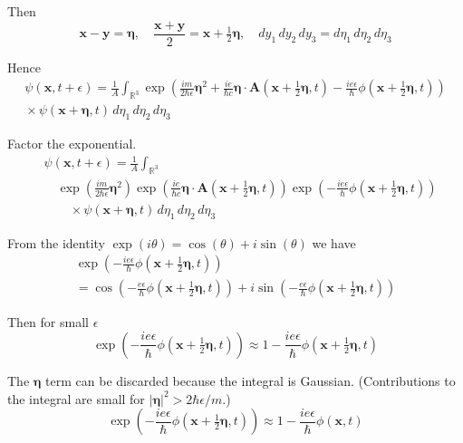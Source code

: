 \documentclass[12pt]{article}
\newcommand\INT{\int_{\mathbb R^3}}
\begin{document}
Then
\begin{equation*}
\mathbf x-\mathbf y=\boldsymbol\eta,\quad
\frac{\mathbf x+\mathbf y}{2}=\mathbf{x}+\tfrac{1}{2}\boldsymbol\eta,\quad
dy_1\,dy_2\,dy_3=d\eta_1\,d\eta_2\,d\eta_3
\end{equation*}

Hence
\begin{multline*}
\psi(\mathbf x,t+\epsilon)=
\frac{1}{A}\INT\exp
\left(
\frac{im}{2\hbar\epsilon}\boldsymbol\eta^2
+\frac{ie}{\hbar c}\boldsymbol\eta\cdot\mathbf A\left(\mathbf x+\tfrac{1}{2}\boldsymbol\eta,t\right)
-\frac{ie\epsilon}{\hbar}\phi\left(\mathbf x+\tfrac{1}{2}\boldsymbol\eta,t\right)
\right)
\\
{}\times\psi(\mathbf x+\boldsymbol\eta,t)
\,d\eta_1\,d\eta_2\,d\eta_3
\end{multline*}

Factor the exponential.
\begin{align*}
&\psi(\mathbf x,t+\epsilon)=
\frac{1}{A}\INT
\\
&\quad{}\exp\left(\frac{im}{2\hbar\epsilon}\boldsymbol\eta^2\right)
\exp\left(\frac{ie}{\hbar c}\boldsymbol\eta\cdot\mathbf A\left(\mathbf x+\tfrac{1}{2}\boldsymbol\eta,t\right)\right)
\exp\left(-\frac{ie\epsilon}{\hbar}\phi\left(\mathbf x+\tfrac{1}{2}\boldsymbol\eta,t\right)\right)
\\
&\quad\quad{}\times\psi(\mathbf x+\boldsymbol\eta,t)
\,d\eta_1\,d\eta_2\,d\eta_3
\tag{2}
\end{align*}

From the identity $\exp(i\theta)=\cos(\theta)+i\sin(\theta)$ we have
\begin{multline*}
\exp\left(-\frac{ie\epsilon}{\hbar}\phi\left(\mathbf x+\tfrac{1}{2}\boldsymbol\eta,t\right)\right)
\\
=\cos\left(-\frac{e\epsilon}{\hbar}\phi\left(\mathbf x+\tfrac{1}{2}\boldsymbol\eta,t\right)\right)
+i\sin\left(-\frac{e\epsilon}{\hbar}\phi\left(\mathbf x+\tfrac{1}{2}\boldsymbol\eta,t\right)\right)
\end{multline*}

Then for small $\epsilon$
\begin{equation*}
\exp\left(-\frac{ie\epsilon}{\hbar}\phi\left(\mathbf x+\tfrac{1}{2}\boldsymbol\eta,t\right)\right)
\approx
1-\frac{ie\epsilon}{\hbar}\phi\left(\mathbf x+\tfrac{1}{2}\boldsymbol\eta,t\right)
\end{equation*}

The $\boldsymbol\eta$ term can be discarded because the integral is Gaussian.
(Contributions to the integral are small for $|\boldsymbol\eta|^2>2\hbar\epsilon/m$.)
\begin{equation*}
\exp\left(-\frac{ie\epsilon}{\hbar}\phi\left(\mathbf x+\tfrac{1}{2}\boldsymbol\eta,t\right)\right)\approx
1-\frac{ie\epsilon}{\hbar}\phi\left(\mathbf x,t\right)
\tag{3}
\end{equation*}
\end{document}
